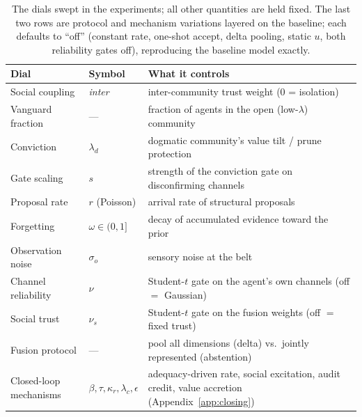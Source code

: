 \documentclass[runningheads]{llncs}
\begin{document}
\begin{table}[h!]
\centering\footnotesize
\begin{tabular}{lll}
\hline
Dial & Symbol & What it controls \\
\hline
Social coupling & \emph{inter} & inter-community trust weight (0 = isolation) \\
Vanguard fraction & --- & fraction of agents in the open (low-$\lambda$) community \\
Conviction & $\lambda_d$ & dogmatic community's value tilt / prune protection \\
Gate scaling & $s$ & strength of the conviction gate on disconfirming channels \\
Proposal rate & $r$ (Poisson) & arrival rate of structural proposals \\
Forgetting & $\omega\in(0,1]$ & decay of accumulated evidence toward the prior \\
Observation noise & $\sigma_o$ & sensory noise at the belt \\
Channel reliability & $\nu$ & Student-$t$ gate on the agent's own channels (off $=$ Gaussian) \\
Social trust & $\nu_s$ & Student-$t$ gate on the fusion weights (off $=$ fixed trust) \\
Fusion protocol & --- & pool all dimensions (delta) vs.\ jointly represented (abstention) \\
Closed-loop mechanisms & $\beta,\tau,\kappa_r,\lambda_c,\epsilon$ & adequacy-driven rate, social
excitation, audit credit, value accretion (Appendix~\ref{app:closing}) \\
\hline
\end{tabular}
\caption{The dials swept in the experiments; all other quantities are held fixed. The last two
rows are protocol and mechanism variations layered on the baseline; each defaults to ``off''
(constant rate, one-shot accept, delta pooling, static $u$, both reliability gates off),
reproducing the baseline model exactly.}
\label{tab:dials}
\end{table}
\end{document}
